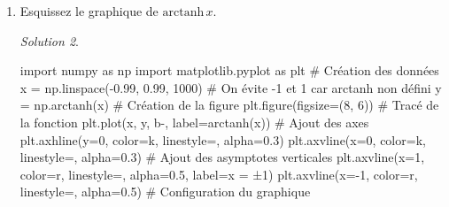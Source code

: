 \documentclass[
  12pt,
  letterpaper,
]{book}
\newenvironment{Shaded}{}{}
\newcommand{\CommentTok}[1]{\textcolor[rgb]{0.42,0.45,0.49}{#1}}
\newcommand{\DecValTok}[1]{\textcolor[rgb]{0.00,0.36,0.77}{#1}}
\newcommand{\FloatTok}[1]{\textcolor[rgb]{0.00,0.36,0.77}{#1}}
\newcommand{\ImportTok}[1]{\textcolor[rgb]{0.01,0.18,0.38}{#1}}
\newcommand{\NormalTok}[1]{\textcolor[rgb]{0.14,0.16,0.18}{#1}}
\newcommand{\OperatorTok}[1]{\textcolor[rgb]{0.14,0.16,0.18}{#1}}
\newcommand{\StringTok}[1]{\textcolor[rgb]{0.01,0.18,0.38}{#1}}
\theoremstyle{remark}
\newtheorem*{solution}{Solution}
\begin{document}
\begin{enumerate}
\begin{solution}
  \end{solution}
\item
  Esquissez le graphique de \(\text{arctanh}\,x\).

  \begin{solution}

\begin{Shaded}
\begin{Highlighting}[]
\ImportTok{import}\NormalTok{ numpy }\ImportTok{as}\NormalTok{ np}
\ImportTok{import}\NormalTok{ matplotlib.pyplot }\ImportTok{as}\NormalTok{ plt}
\CommentTok{\# Création des données}
\NormalTok{x }\OperatorTok{=}\NormalTok{ np.linspace(}\OperatorTok{{-}}\FloatTok{0.99}\NormalTok{, }\FloatTok{0.99}\NormalTok{, }\DecValTok{1000}\NormalTok{)  }\CommentTok{\# On évite {-}1 et 1 car arctanh non défini}
\NormalTok{y }\OperatorTok{=}\NormalTok{ np.arctanh(x)}
\CommentTok{\# Création de la figure}
\NormalTok{plt.figure(figsize}\OperatorTok{=}\NormalTok{(}\DecValTok{8}\NormalTok{, }\DecValTok{6}\NormalTok{))}
\CommentTok{\# Tracé de la fonction}
\NormalTok{plt.plot(x, y, }\StringTok{\textquotesingle{}b{-}\textquotesingle{}}\NormalTok{, label}\OperatorTok{=}\StringTok{\textquotesingle{}arctanh(x)\textquotesingle{}}\NormalTok{)}
\CommentTok{\# Ajout des axes}
\NormalTok{plt.axhline(y}\OperatorTok{=}\DecValTok{0}\NormalTok{, color}\OperatorTok{=}\StringTok{\textquotesingle{}k\textquotesingle{}}\NormalTok{, linestyle}\OperatorTok{=}\StringTok{\textquotesingle{}{-}\textquotesingle{}}\NormalTok{, alpha}\OperatorTok{=}\FloatTok{0.3}\NormalTok{)}
\NormalTok{plt.axvline(x}\OperatorTok{=}\DecValTok{0}\NormalTok{, color}\OperatorTok{=}\StringTok{\textquotesingle{}k\textquotesingle{}}\NormalTok{, linestyle}\OperatorTok{=}\StringTok{\textquotesingle{}{-}\textquotesingle{}}\NormalTok{, alpha}\OperatorTok{=}\FloatTok{0.3}\NormalTok{)}
\CommentTok{\# Ajout des asymptotes verticales}
\NormalTok{plt.axvline(x}\OperatorTok{=}\DecValTok{1}\NormalTok{, color}\OperatorTok{=}\StringTok{\textquotesingle{}r\textquotesingle{}}\NormalTok{, linestyle}\OperatorTok{=}\StringTok{\textquotesingle{}{-}{-}\textquotesingle{}}\NormalTok{, alpha}\OperatorTok{=}\FloatTok{0.5}\NormalTok{, label}\OperatorTok{=}\StringTok{\textquotesingle{}x = ±1\textquotesingle{}}\NormalTok{)}
\NormalTok{plt.axvline(x}\OperatorTok{={-}}\DecValTok{1}\NormalTok{, color}\OperatorTok{=}\StringTok{\textquotesingle{}r\textquotesingle{}}\NormalTok{, linestyle}\OperatorTok{=}\StringTok{\textquotesingle{}{-}{-}\textquotesingle{}}\NormalTok{, alpha}\OperatorTok{=}\FloatTok{0.5}\NormalTok{)}
\CommentTok{\# Configuration du graphique}

\end{Highlighting}
\end{Shaded}
\end{solution}
\end{enumerate}
\end{document}
